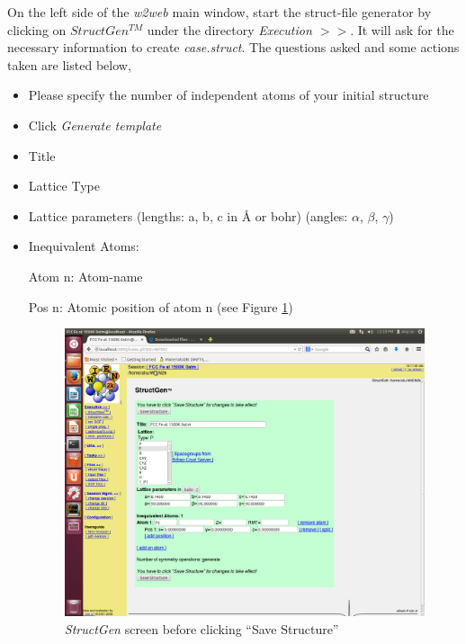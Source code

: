 \documentclass[12 pt]{article}
\begin{document}
\begin{itemize}[leftmargin=0.2in]
  On the left side of the \emph{w2web} main window, start the struct-file generator by clicking on 
\emph{$StructGen^{TM}$} under the directory \emph{Execution $>>$}. It will ask for the necessary information to 
create \emph{case.struct}. The questions asked and some actions taken are listed below,

    \begin{itemize}

      \item Please specify the number of independent atoms of your initial structure

      \item Click \emph{Generate template}

      \item Title

      \item Lattice Type

      \item Lattice parameters (lengths: a, b, c in \AA{} or bohr) (angles: $\alpha$, $\beta$, $\gamma$)

      \item Inequivalent Atoms:

	  Atom n: Atom-name

	  Pos n: Atomic position of atom n (see Figure \ref{StructGen screen before clicking ``Save Structure''})

  \begin{figure}[h]
    \centering
    \caption{\emph{StructGen} screen before clicking ``Save Structure''}
    \label{StructGen screen before clicking ``Save Structure''}
    \vspace{2ex}
    \includegraphics[scale=0.35, trim=2.3cm 0cm 0cm 4.3cm, clip=true]{StructGen2}
  \end{figure}


\end{itemize}
\end{itemize}
\end{document}
